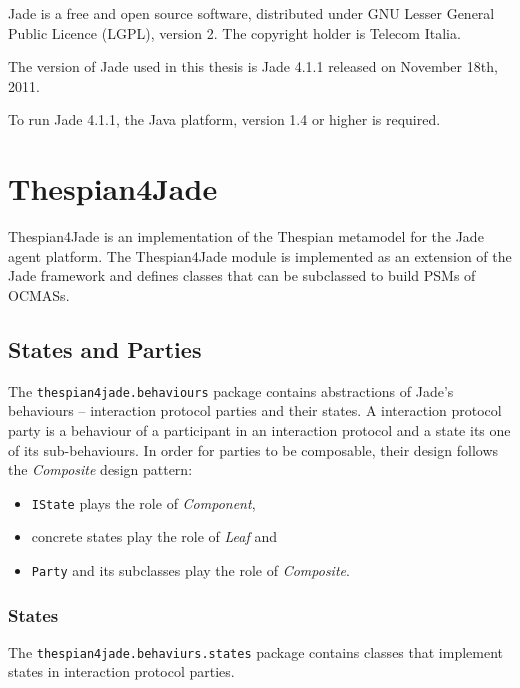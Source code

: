 Jade is a free and open source software, distributed under GNU Lesser General Public Licence (LGPL), version 2.
The copyright holder is Telecom Italia.

The version of Jade used in this thesis is Jade 4.1.1 released on November 18th, 2011.

To run Jade 4.1.1, the Java platform, version 1.4 or higher is required.

\section{Thespian4Jade}

Thespian4Jade is an implementation of the Thespian metamodel for the Jade agent platform.
The Thespian4Jade module is implemented as an extension of the Jade framework and defines classes that can be subclassed to build PSMs of OCMASs.

\subsection{States and Parties}

The \texttt{thespian4jade.behaviours} package contains abstractions of Jade's behaviours -- interaction protocol parties and their states.
A interaction protocol party is a behaviour of a participant in an interaction protocol and a state its one of its sub-behaviours.
In order for parties to be composable, their design follows the \textit{Composite} design pattern:
\begin{itemize}
	\item \texttt{IState} plays the role of \textit{Component},
	\item concrete states play the role of \textit{Leaf} and
	\item \texttt{Party} and its subclasses play the role of \textit{Composite}.
\end{itemize}

\subsubsection{States}

The \texttt{thespian4jade.behaviurs.states} package contains classes that implement states in interaction protocol parties.

